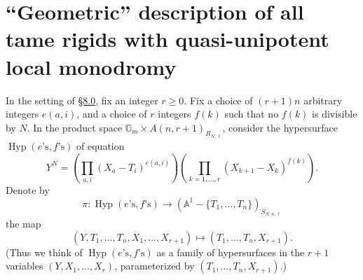 \section[``Geometric'' description of tame rigids]{``Geometric'' description of all tame rigids with quasi-\allowbreak{}unipotent local monodromy}
\label{sec:8.4}

\label{par:8.4.1}
In the setting of \hyperref[sec:8.0]{\S8.0}, fix an integer \(r\geq0\). Fix a choice of \((r+1)n\) arbitrary integers \(e(a,i)\), and a choice of \(r\) integers \(f(k)\) such that no \(f(k)\) is divisible by \(N\). In the product space \(\mathbb{G}_m\times A(n,r+1)_{R_{N,\ell}}\), consider the hypersurface \(\operatorname{Hyp}(e\text{'s},f\text{'s})\) of equation
\[
Y^N=\left(\prod_{a,i}(X_a-T_i)^{e(a,i)}\right)\left(\prod_{k=1,\ldots,r}(X_{k+1}-X_k)^{f(k)}\right).
\]
Denote by
\[
\pi:\operatorname{Hyp}(e\text{'s},f\text{'s})\to(\mathbb{A}^1-\{T_1,\ldots,T_n\})_{S_{N,n,\ell}}
\]
the map
\[
(Y,T_1,\ldots,T_n,X_1,\ldots,X_{r+1})\mapsto(T_1,\ldots,T_n,X_{r+1}).
\]
(Thus we think of \(\operatorname{Hyp}(e\text{'s},f\text{'s})\) as a family of hypersurfaces in the \(r+1\) variables \((Y,X_1,\ldots,X_r)\), parameterized by \((T_1,\ldots,T_n,X_{r+1})\).)

